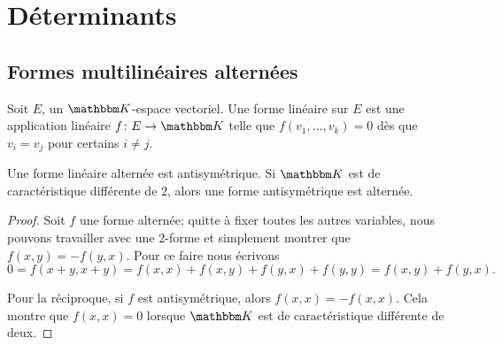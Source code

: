 
\section{Déterminants}
\label{SecGYzHWs}

\subsection{Formes multilinéaires alternées}



\begin{definition}       \label{DEFooYWOBooUGJojy}
    Soit \( E\), un \( \eK\)-espace vectoriel. Une forme linéaire  sur \( E\) est une application linéaire \( f\colon E\to \eK\) telle que \( f(v_1,\ldots, v_k)=0\) dès que \( v_i=v_j\) pour certains \( i\neq j\).
\end{definition}

\begin{lemma}   \label{LemHiHNey}
    Une forme linéaire alternée est antisymétrique. Si \( \eK\) est de caractéristique différente de \( 2\), alors une forme antisymétrique est alternée.
\end{lemma}

\begin{proof}
    Soit \( f\) une forme alternée; quitte à fixer toutes les autres variables, nous pouvons travailler avec une \( 2\)-forme et simplement montrer que \( f(x,y)=-f(y,x)\). Pour ce faire nous écrivons
    \begin{equation}
        0=f(x+y,x+y)=f(x,x)+f(x,y)+f(y,x)+f(y,y)=f(x,y)+f(y,x).
    \end{equation}

    Pour la réciproque, si \( f\) est antisymétrique, alors \( f(x,x)=-f(x,x)\). Cela montre que \( f(x,x)=0\) lorsque \( \eK\) est de caractéristique différente de deux.
\end{proof}


